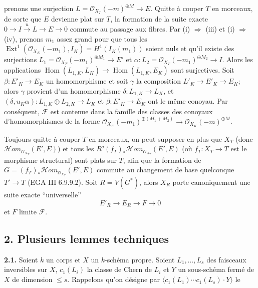 prenons une surjection \(L=\mathcal O_{X_T}(-m)^{\oplus M}\longrightarrow E\). Quitte à couper \(T\) en morceaux, de sorte que \(E\) devienne plat sur \(T\), la formation de la suite exacte \(0\longrightarrow I\xrightarrow{u}L\longrightarrow E\longrightarrow0\) commute au passage aux fibres. Par (i) \(\Rightarrow\) (iii) et (i) \(\Rightarrow\) (iv), prenons \(m_1\) assez grand pour que tous les \(\operatorname{Ext}^1(\mathcal O_{X_K}(-m_1),I_K)=H^1(I_K(m_1))\) soient nuls et qu'il existe des surjections \(L_1=\mathcal O_{X_T}(-m_1)^{\oplus M_1}\longrightarrow E'\) et \(\alpha:L_2=\mathcal O_{X_T}(-m_1)^{\oplus M_2}\longrightarrow I\). Alors les applications \(\operatorname{Hom}(L_{1,K},L_K)\longrightarrow \operatorname{Hom}(L_{1,K},E_K)\) sont surjectives. Soit \(\beta:E'_K\to E_K\) un homomorphisme et soit \(\gamma\) la composition \(L'_K\to E'_K\to E_K\); alors \(\gamma\) provient d'un homomorphisme \(\delta:L_{1,K}\to L_K\), et $(\delta,u_K\alpha):L_{1,K}\oplus L_{2,K}\longrightarrow L_K$ et \(\beta:E'_K\to E_K\) ont le même conoyau. Par conséquent, \(\mathcal F\) est contenue dans la famille des classes des conoyaux d'homomorphismes de la forme \(\mathcal O_{X_K}(-m_1)^{\oplus(M_1+M_2)}\longrightarrow \mathcal O_{X_K}(-m)^{\oplus M}\).

Toujours quitte à couper \(T\) en morceaux, on peut supposer en plus que \(X_T\) (donc \(\mathcal H\!om_{\mathcal O_{X_T}}(E',E)\)) et tous les \(R^q(f_T)_*\mathcal H\!om_{\mathcal O_{X_T}}(E',E)\) (où \(f_T:X_T\to T\) est le morphisme structural) sont plats sur \(T\), afin que la formation de \(G=(f_T)_*\mathcal H\!om_{\mathcal O_{X_T}}(E',E)\) commute au changement de base quelconque \(T'\to T\) (EGA III 6.9.9.2). Soit $R=V(G^*)$, alors \(X_R\) porte canoniquement une suite exacte ``universelle''
\[
E'_R\longrightarrow E_R\longrightarrow F\longrightarrow0
\]
et \(F\) limite \(\mathcal F\).

\subsection*{2. Plusieurs lemmes techniques}
\textbf{2.1.} Soient \(k\) un corps et \(X\) un \(k\)-schéma propre. Soient \(L_1,\ldots,L_s\) des faisceaux inversibles sur \(X\), \(c_1(L_i)\) la classe de Chern de \(L_i\) et \(Y\) un sous-schéma fermé de \(X\) de dimension \(\le s\). Rappelons qu'on désigne par \(\langle c_1(L_1)\cdots c_1(L_s)\cdot Y\rangle\) le
